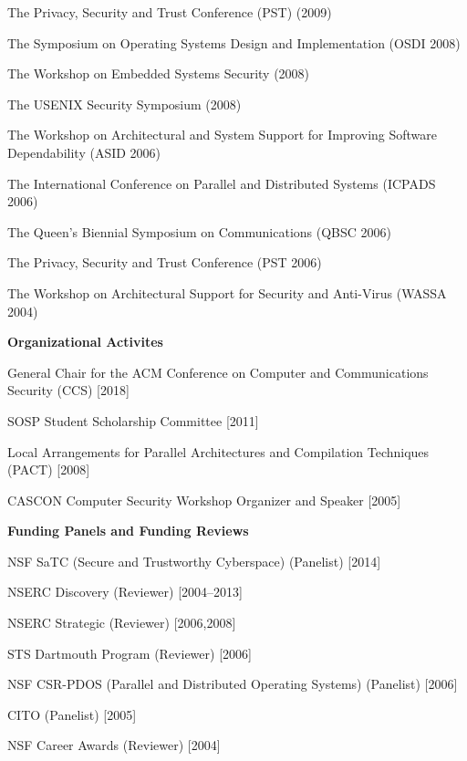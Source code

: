 \documentclass[10pt]{article}
\newenvironment{lonelist}[1][\enskip\textbullet]%
        {\vspace{-\baselineskip}\begin{list}{#1}{%
        \setlength{\partopsep}{0pt}%
        \setlength{\topsep}{0pt}
	\setlength{\leftmargin}{0pt}}}
        {\end{list}\vspace{-.6\baselineskip}}
\newenvironment{innerenum}[1][1.]%
        {\begin{compactenum}[#1]}{\end{compactenum}}
\begin{document}
\begin{lonelist}
\begin{innerenum}
\item The Privacy, Security and Trust Conference (PST) (2009)
\item The Symposium on Operating Systems Design and Implementation (OSDI 2008)
\item The Workshop on Embedded Systems Security (2008)
\item The USENIX Security Symposium (2008)
\item The Workshop on Architectural and System Support for Improving Software Dependability (ASID 2006)
\item The International Conference on Parallel and Distributed Systems (ICPADS 2006)
\item The Queen's Biennial Symposium on Communications (QBSC 2006)
\item The Privacy, Security and Trust Conference (PST 2006)
\item The Workshop on Architectural Support for Security and Anti-Virus (WASSA 2004)
\end{innerenum}

\item[] {\bf Organizational Activites}
\begin{innerenum}
\item General Chair for the ACM Conference on Computer and Communications Security (CCS) [2018]
\item SOSP Student Scholarship Committee [2011]
\item Local Arrangements for Parallel Architectures and Compilation Techniques (PACT) [2008]
\item CASCON Computer Security Workshop Organizer and Speaker [2005]
\end{innerenum}


\item[] {\bf Funding Panels and Funding Reviews}
\begin{innerenum}
\item NSF SaTC (Secure and Trustworthy Cyberspace) (Panelist) [2014]
\item NSERC Discovery (Reviewer) [2004--2013] 
\item NSERC Strategic (Reviewer) [2006,2008] 
\item STS Dartmouth Program (Reviewer) [2006] 
\item NSF CSR-PDOS (Parallel and Distributed Operating Systems) (Panelist) [2006] 
\item CITO (Panelist) [2005]
\item NSF Career Awards (Reviewer) [2004]
\end{innerenum}


\end{lonelist}
\end{document}
